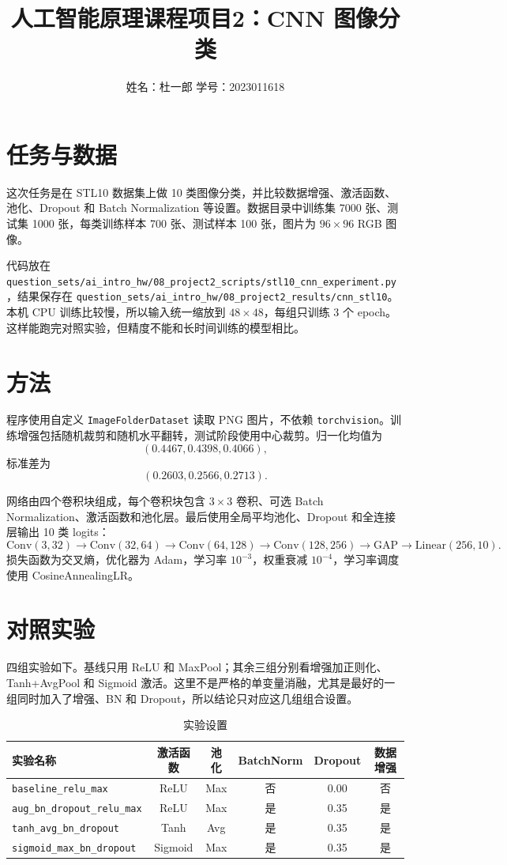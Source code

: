 \documentclass[a4paper,11pt]{article}
\title{人工智能原理课程项目2：CNN 图像分类}
\author{姓名：杜一郎 \quad 学号：2023011618}
\date{}
\begin{document}
\maketitle

\section{任务与数据}

这次任务是在 STL10 数据集上做 10 类图像分类，并比较数据增强、激活函数、池化、Dropout 和 Batch Normalization 等设置。数据目录中训练集 7000 张、测试集 1000 张，每类训练样本 700 张、测试样本 100 张，图片为 \(96\times96\) RGB 图像。

代码放在 \texttt{question\_sets/ai\_intro\_hw/08\_project2\_scripts/stl10\_cnn\_experiment.py}，结果保存在 \texttt{question\_sets/ai\_intro\_hw/08\_project2\_results/cnn\_stl10}。本机 CPU 训练比较慢，所以输入统一缩放到 \(48\times48\)，每组只训练 3 个 epoch。这样能跑完对照实验，但精度不能和长时间训练的模型相比。

\section{方法}

程序使用自定义 \texttt{ImageFolderDataset} 读取 PNG 图片，不依赖 \texttt{torchvision}。训练增强包括随机裁剪和随机水平翻转，测试阶段使用中心裁剪。归一化均值为
\[
(0.4467,0.4398,0.4066),
\]
标准差为
\[
(0.2603,0.2566,0.2713).
\]

网络由四个卷积块组成，每个卷积块包含 \(3\times3\) 卷积、可选 Batch Normalization、激活函数和池化层。最后使用全局平均池化、Dropout 和全连接层输出 10 类 logits：
\[
\mathrm{Conv}(3,32)\rightarrow \mathrm{Conv}(32,64)\rightarrow
\mathrm{Conv}(64,128)\rightarrow \mathrm{Conv}(128,256)\rightarrow
\mathrm{GAP}\rightarrow \mathrm{Linear}(256,10).
\]
损失函数为交叉熵，优化器为 Adam，学习率 \(10^{-3}\)，权重衰减 \(10^{-4}\)，学习率调度使用 CosineAnnealingLR。

\section{对照实验}

四组实验如下。基线只用 ReLU 和 MaxPool；其余三组分别看增强加正则化、Tanh+AvgPool 和 Sigmoid 激活。这里不是严格的单变量消融，尤其是最好的一组同时加入了增强、BN 和 Dropout，所以结论只对应这几组组合设置。

\begin{table}[H]
\centering
\caption{实验设置}
\small
\begin{tabular}{lccccc}
\toprule
实验名称 & 激活函数 & 池化 & BatchNorm & Dropout & 数据增强\\
\midrule
\texttt{baseline\_relu\_max} & ReLU & Max & 否 & 0.00 & 否\\
\texttt{aug\_bn\_dropout\_relu\_max} & ReLU & Max & 是 & 0.35 & 是\\
\texttt{tanh\_avg\_bn\_dropout} & Tanh & Avg & 是 & 0.35 & 是\\
\texttt{sigmoid\_max\_bn\_dropout} & Sigmoid & Max & 是 & 0.35 & 是\\
\bottomrule
\end{tabular}
\end{table}
\end{document}
